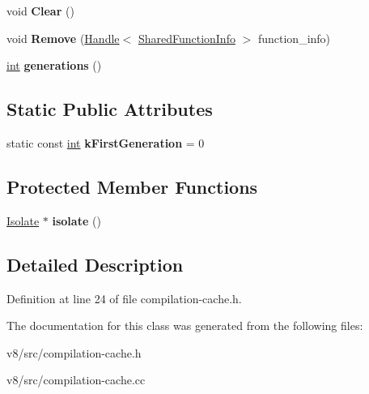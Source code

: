 \begin{DoxyCompactItemize}
void {\bfseries Clear} ()
\item 
\mbox{\label{classv8_1_1internal_1_1CompilationSubCache_a3fd0a729c12e76a804fc2fe3145ffd56}} 
void {\bfseries Remove} (\mbox{\hyperlink{classv8_1_1internal_1_1Handle}{Handle}}$<$ \mbox{\hyperlink{classv8_1_1internal_1_1SharedFunctionInfo}{Shared\+Function\+Info}} $>$ function\+\_\+info)
\item 
\mbox{\label{classv8_1_1internal_1_1CompilationSubCache_aa52ea32923a9315f2737467f210b8704}} 
\mbox{\hyperlink{classint}{int}} {\bfseries generations} ()
\end{DoxyCompactItemize}
\subsection*{Static Public Attributes}
\begin{DoxyCompactItemize}
\item 
\mbox{\label{classv8_1_1internal_1_1CompilationSubCache_ac9d60da247fabc94383eabd9825fc203}} 
static const \mbox{\hyperlink{classint}{int}} {\bfseries k\+First\+Generation} = 0
\end{DoxyCompactItemize}
\subsection*{Protected Member Functions}
\begin{DoxyCompactItemize}
\item 
\mbox{\label{classv8_1_1internal_1_1CompilationSubCache_ade6feffbd1eb87a71e3bcfabe1d675d6}} 
\mbox{\hyperlink{classv8_1_1internal_1_1Isolate}{Isolate}} $\ast$ {\bfseries isolate} ()
\end{DoxyCompactItemize}


\subsection{Detailed Description}


Definition at line 24 of file compilation-\/cache.\+h.



The documentation for this class was generated from the following files\+:\begin{DoxyCompactItemize}
\item 
v8/src/compilation-\/cache.\+h\item 
v8/src/compilation-\/cache.\+cc\end{DoxyCompactItemize}
